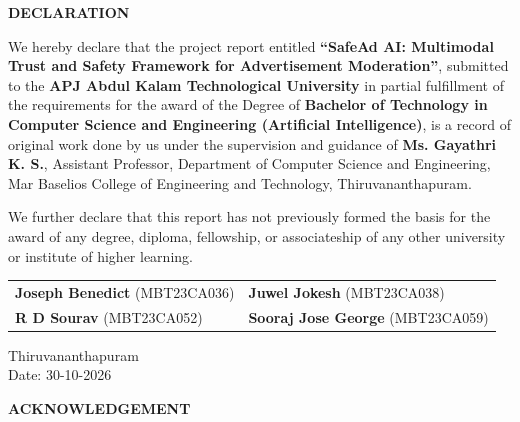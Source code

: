 \documentclass[12pt,a4paper]{report}
\begin{document}

\newpage
\thispagestyle{empty}

\begin{center}
{\bf \Large DECLARATION}
\end{center}

\vspace{0.8cm}

\noindent We hereby declare that the project report entitled \textbf{``SafeAd AI: Multimodal Trust and Safety Framework for Advertisement Moderation''}, submitted to the \textbf{APJ Abdul Kalam Technological University} in partial fulfillment of the requirements for the award of the Degree of \textbf{Bachelor of Technology in Computer Science and Engineering (Artificial Intelligence)}, is a record of original work done by us under the supervision and guidance of \textbf{Ms. Gayathri K. S.}, Assistant Professor, Department of Computer Science and Engineering, Mar Baselios College of Engineering and Technology, Thiruvananthapuram.

\vspace{0.4cm}

\noindent We further declare that this report has not previously formed the basis for the award of any degree, diploma, fellowship, or associateship of any other university or institute of higher learning.

\vspace{1.8cm}

\noindent
\begin{tabular}{@{}p{7.5cm}p{7.5cm}@{}}
\textbf{Joseph Benedict} (MBT23CA036) & \textbf{Juwel Jokesh} (MBT23CA038) \\[1.2cm]
\textbf{R D Sourav} (MBT23CA052) & \textbf{Sooraj Jose George} (MBT23CA059)
\end{tabular}

\vspace{1.0cm}
\noindent Thiruvananthapuram \\
\noindent Date: 30-10-2026


\newpage
\thispagestyle{empty}

\begin{center}
{\bf \Large ACKNOWLEDGEMENT}
\end{center}
\end{document}
